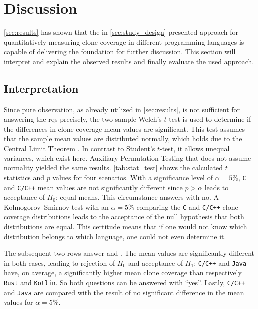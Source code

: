 \section{Discussion}
\label{sec:discussion}

\autoref{sec:results} has shown that the in \autoref{sec:study_design} presented approach for quantitatively measuring clone coverage in different programming languages is capable of delivering the foundation for further discussion. This section will interpret and explain the observed results and finally evaluate the used approach.

\subsection{Interpretation}

Since pure observation, as already utilized in \autoref{sec:results}, is not sufficient for answering the \aclp{rq} precisely, the two-sample Welch's $t$-test is used to determine if the differences in clone coverage mean values are significant. This test assumes that the sample mean values are distributed normally, which holds due to the Central Limit Theorem \cite{shafer2022introductory}. In contrast to Student's $t$-test, it allows unequal variances, which exist here.
Auxiliary Permutation Testing that does not assume normality yielded the same results.
\autoref{tab:stat_test} shows the calculated $t$ statistics and $p$ values for four scenarios. With a significance level of $\alpha = 5\%$, \texttt{C} and \texttt{C/C++} mean values are not significantly different since $p > \alpha$ leads to acceptance of $H_0$: equal means. This circumstance answers  with no.
A Kolmogorov–Smirnov test with an $\alpha=5\%$ comparing the \texttt{C} and \texttt{C/C++} clone coverage distributions leads to the acceptance of the null hypothesis that both distributions are equal. This certitude means that if one would not know which distribution belongs to which language, one could not even determine it.

The subsequent two rows answer  and . The mean values are significantly different in both cases, leading to rejection of $H_0$ and acceptance of $H_1$: \texttt{C/C++} and \texttt{Java} have, on average, a significantly higher mean clone coverage than respectively \texttt{Rust} and \texttt{Kotlin}. So both questions can be answered with ``yes''.
Lastly, \texttt{C/C++} and \texttt{Java} are compared with the result of no significant difference in the mean values for $\alpha = 5\%$.

